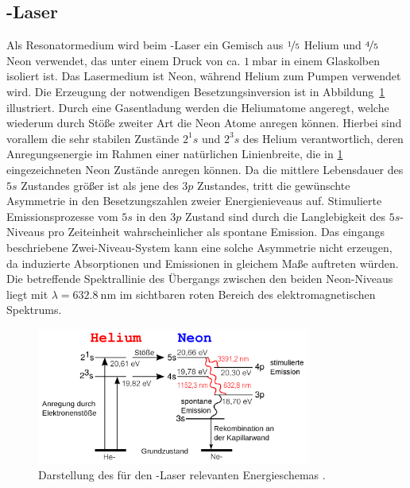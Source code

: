 \subsection{-Laser }
Als Resonatormedium wird beim -Laser ein Gemisch aus $\nicefrac{1}{5}$ Helium und
$\nicefrac{4}{5}$ Neon verwendet, das unter einem Druck von
ca. $\SI{1}{\milli\bar}$ in einem Glaskolben isoliert ist. Das Lasermedium ist Neon, während Helium zum Pumpen verwendet wird.
Die Erzeugung der notwendigen Besetzungsinversion ist in Abbildung~\ref{fig:energieschema}
illustriert. Durch eine Gasentladung werden
die Heliumatome angeregt, welche wiederum durch Stöße zweiter Art die Neon Atome anregen können. Hierbei sind vorallem die sehr stabilen Zustände
$2^1s$ und $2^3s$ des Helium verantwortlich, deren Anregungsenergie im Rahmen einer natürlichen Linienbreite, die in \ref{fig:energieschema}
eingezeichneten Neon Zustände anregen können. Da die mittlere Lebensdauer des $5s$ Zustandes größer ist als jene des $3p$ Zustandes, tritt die gewünschte
Asymmetrie in den Besetzungszahlen zweier Energienieveaus auf. Stimulierte Emissionsprozesse vom $5s$ in den $3p$ Zustand sind durch die Langlebigkeit
des $5s$-Niveaus pro Zeiteinheit wahrscheinlicher als spontane Emission. Das eingangs beschriebene Zwei-Niveau-System kann eine solche
Asymmetrie nicht erzeugen, da induzierte Absorptionen und Emissionen in gleichem Maße auftreten würden.
Die betreffende Spektrallinie des Übergangs zwischen den beiden Neon-Niveaus liegt mit $\lambda = \SI{632.8}{\nano\meter}$ im sichtbaren
roten Bereich des elektromagnetischen Spektrums.
\begin{figure}
	\centering
	\includegraphics[width = 0.8\textwidth]{pictures/energieschema.png}
	\caption{Darstellung des für den -Laser relevanten Energieschemas \cite{wiki}.}
        \label{fig:energieschema}
\end{figure}
